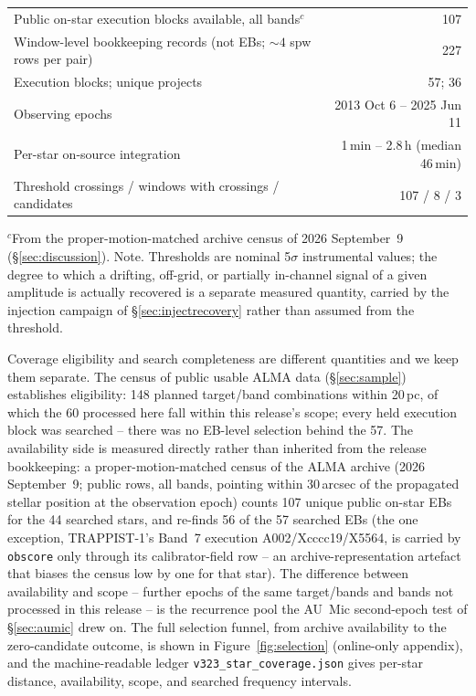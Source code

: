 \documentclass{openjournal}
\begin{document}
\begin{table}
\begin{tabular}{@{}l r@{}}
Public on-star execution blocks available, all bands$^{c}$ & 107 \\
Window-level bookkeeping records (not EBs; ${\sim}4$ spw rows per pair) & 227 \\
Execution blocks; unique projects & 57; 36 \\
Observing epochs & 2013 Oct 6 -- 2025 Jun 11 \\
Per-star on-source integration & 1\,min -- 2.8\,h (median 46\,min) \\
Threshold crossings / windows with crossings / candidates & 107 / 8 / 3 \\
\hline
\end{tabular}
\par\vspace{3pt}
\parbox{\columnwidth}{\footnotesize $^{c}$From the proper-motion-matched
archive census of 2026 September~9 (\S\ref{sec:discussion}). Note.
Thresholds are nominal
5$\sigma$ instrumental values; the degree to which a drifting,
off-grid, or partially in-channel signal of a given amplitude is
actually recovered is a separate measured quantity, carried by the
injection campaign of \S\ref{sec:injectrecovery} rather than assumed
from the threshold.}
\end{table}


Coverage eligibility and search completeness are different quantities
and we keep them separate. The census of public usable ALMA data
(\S\ref{sec:sample}) establishes eligibility: 148 planned
target/band combinations within 20\,pc, of which the 60 processed here
fall within this release's scope; every held execution block was
searched -- there was no EB-level selection behind the 57. The
availability side is measured directly rather than inherited from the
release bookkeeping: a proper-motion-matched census of the ALMA
archive (2026 September~9; public rows, all bands, pointing within
30\,arcsec of the propagated stellar position at the observation
epoch) counts 107 unique public on-star EBs for the 44 searched stars,
and re-finds 56 of the 57 searched EBs (the one exception,
TRAPPIST-1's Band~7 execution A002/Xcccc19/X5564, is carried by
\texttt{obscore} only through its calibrator-field row -- an
archive-representation artefact that biases the census low by one for
that star). The difference between availability and scope -- further
epochs of the same target/bands and bands not processed in this
release -- is the recurrence pool the AU~Mic second-epoch test of
\S\ref{sec:aumic} drew on. The full selection funnel, from archive
availability to the zero-candidate outcome, is shown in
Figure~\ref{fig:selection} (online-only appendix), and the
machine-readable ledger \texttt{v323\_star\_coverage.json} gives
per-star distance, availability, scope, and searched frequency
intervals.
\end{document}
